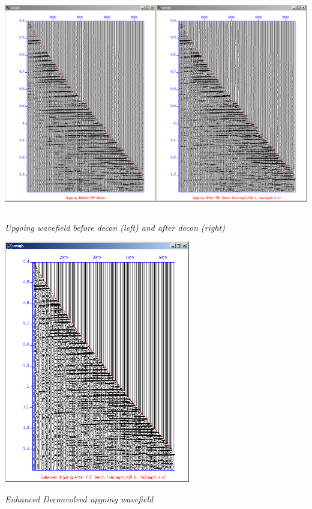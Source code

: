 \documentclass{article}
\begin{document}
\vspace{16pt}
\begin{center}
\includegraphics[width=409pt, height=267pt, keepaspectratio=true]{LatihanVSPsu-fig013.png}

\vspace{16pt}
\textit{Upgoing wavefield before decon (left) and after decon (right)}

\vspace{16pt}
\includegraphics[width=230pt, height=300pt, keepaspectratio=true]{LatihanVSPsu-fig014.png}

\vspace{16pt}
\textit{Enhanced Deconvolved upgoing wavefield\pagebreak{}}
\end{center}
\end{document}
